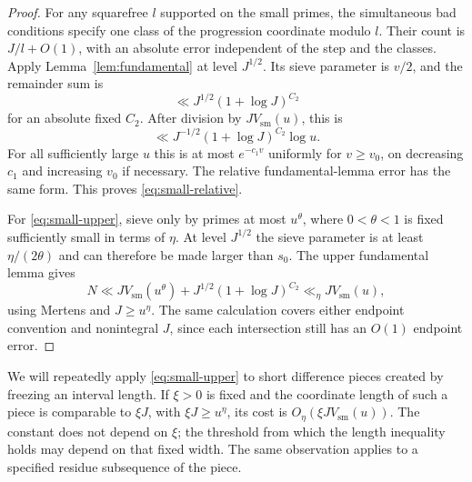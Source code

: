 \begin{proof}
For any squarefree $l$ supported on the small primes, the simultaneous
bad conditions specify one class of the progression coordinate modulo
$l$. Their count is $J/l+O(1)$, with an absolute error independent of
the step and the classes. Apply Lemma~\ref{lem:fundamental} at level
$J^{1/2}$. Its sieve parameter is $v/2$, and the remainder sum is
\[
 \ll J^{1/2}(1+\log J)^{C_2}
\]
for an absolute fixed $C_2$. After division by $JV_{\mathrm{sm}}(u)$, this is
\[
 \ll J^{-1/2}(1+\log J)^{C_2}\log u.
\]
For all sufficiently large $u$ this is at most $e^{-c_1v}$ uniformly
for $v\ge v_0$, on decreasing $c_1$ and increasing $v_0$ if necessary.
The relative fundamental-lemma error has the same form. This proves
\eqref{eq:small-relative}.

For \eqref{eq:small-upper}, sieve only by primes at most $u^\theta$,
where $0<\theta<1$ is fixed sufficiently small in terms of $\eta$.
At level $J^{1/2}$ the sieve parameter is at least
$\eta/(2\theta)$ and can therefore be made larger than $s_0$.
The upper fundamental lemma gives
\[
 N\ll JV_{\mathrm{sm}}(u^\theta)+J^{1/2}(1+\log J)^{C_2}
 \ll_\eta JV_{\mathrm{sm}}(u),
\]
using Mertens and $J\ge u^\eta$. The same calculation covers either
endpoint convention and nonintegral $J$, since each intersection still
has an $O(1)$ endpoint error.
\end{proof}

We will repeatedly apply \eqref{eq:small-upper} to short difference
pieces created by freezing an interval length. If $\xi>0$ is fixed and
the coordinate length of such a piece is comparable to $\xi J$, with
$\xi J\ge u^\eta$, its cost is $O_\eta(\xi JV_{\mathrm{sm}}(u))$. The constant does
not depend on $\xi$; the threshold from which the length inequality
holds may depend on that fixed width. The same observation applies to
a specified residue subsequence of the piece.
